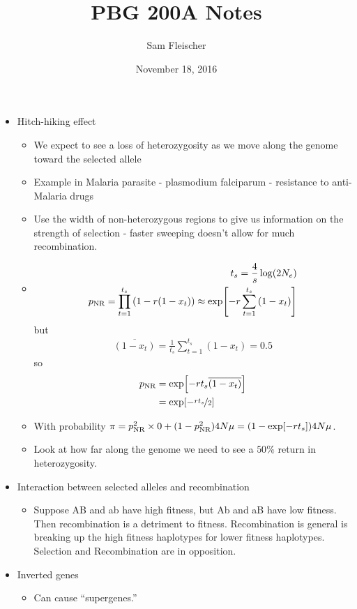 \documentclass{article}
\title{PBG 200A Notes}
\author{Sam Fleischer}
\date{November 18, 2016}
\begin{document}
    \maketitle

    \begin{itemize}
        \item Hitch-hiking effect
        \begin{itemize}
            \item We expect to see a loss of heterozygosity as we move along the genome toward the selected allele
            \item Example in Malaria parasite - plasmodium falciparum - resistance to anti-Malaria drugs
            \item Use the width of non-heterozygous regions to give us information on the strength of selection - faster sweeping doesn't allow for much recombination.
            \item \begin{align}
                t_s = \frac{4}{s}\log(2N_e) \\
                p_{\text{NR}} = \prod_{t=1}^{t_s}\qty(1 - r(1 - x_t)) \approx \exp[-r\sum_{t=1}^{t_s}\qty(1 - x_t)]
            \end{align}
            but
            \begin{align}
                \overline{(1 - x_t)} = \frac{1}{t_s}\sum_{t=1}^{t_s}(1 - x_t) = 0.5
            \end{align}
            so
            \begin{align}
                p_{\text{NR}} &= \exp[-rt_s\overline{(1 - x_t)}] \\
                &= \exp[-\nicefrac{rt_s}{2}]
            \end{align}
            \item With probability $\pi = p_{\text{NR}}^2\times 0 + (1 - p_{\text{NR}}^2)4N\mu = \qty(1 - \exp[-rt_s])4N\mu$.
            \item Look at how far along the genome we need to see a $50\%$ return in heterozygosity.
        \end{itemize}
        \item Interaction between selected alleles and recombination
        \begin{itemize}
            \item Suppose AB and ab have high fitness, but Ab and aB have low fitness.  Then recombination is a detriment to fitness.  Recombination is general is breaking up the high fitness haplotypes for lower fitness haplotypes.  Selection and Recombination are in opposition.
        \end{itemize}
        \item Inverted genes
        \begin{itemize}
            \item Can cause ``supergenes.''
        \end{itemize}
    \end{itemize}
\end{document}
